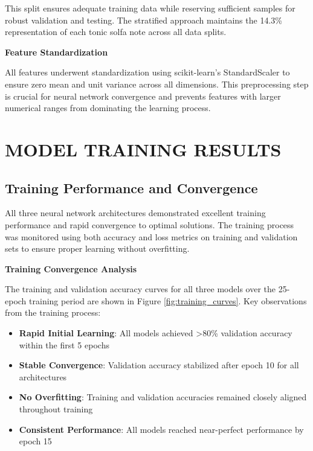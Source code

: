 \documentclass[12pt,a4paper]{article}
\begin{document}
This split ensures adequate training data while reserving sufficient samples for robust validation and testing. The stratified approach maintains the 14.3\% representation of each tonic solfa note across all data splits.

\textbf{Feature Standardization}

All features underwent standardization using scikit-learn's StandardScaler to ensure zero mean and unit variance across all dimensions. This preprocessing step is crucial for neural network convergence and prevents features with larger numerical ranges from dominating the learning process.

\section{MODEL TRAINING RESULTS}

\subsection{Training Performance and Convergence}

All three neural network architectures demonstrated excellent training performance and rapid convergence to optimal solutions. The training process was monitored using both accuracy and loss metrics on training and validation sets to ensure proper learning without overfitting.

\textbf{Training Convergence Analysis}

The training and validation accuracy curves for all three models over the 25-epoch training period are shown in Figure \ref{fig:training_curves}. Key observations from the training process:

\begin{itemize}
\item \textbf{Rapid Initial Learning}: All models achieved >80\% validation accuracy within the first 5 epochs
\item \textbf{Stable Convergence}: Validation accuracy stabilized after epoch 10 for all architectures
\item \textbf{No Overfitting}: Training and validation accuracies remained closely aligned throughout training
\item \textbf{Consistent Performance}: All models reached near-perfect performance by epoch 15
\end{itemize}
\end{document}
